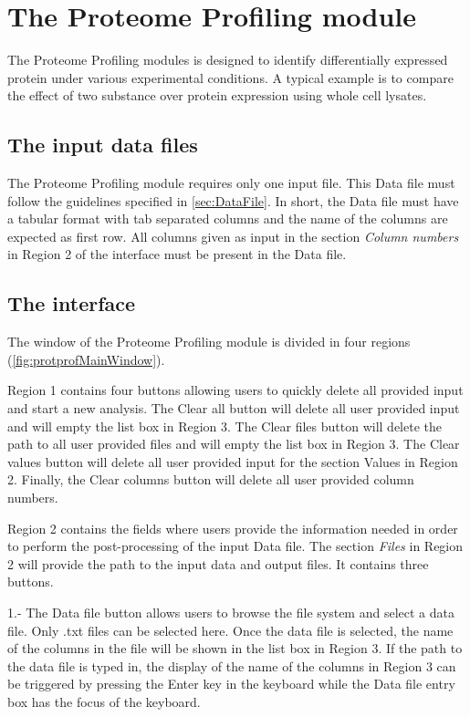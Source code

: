 \chapter{The Proteome Profiling module}
\label{chap:protprof}

The Proteome Profiling modules is designed to identify differentially expressed protein under various experimental conditions. A typical example is to compare the effect of two substance over protein expression using whole cell lysates.  

\section{The input data files}

The Proteome Profiling module requires only one input file. This Data file must follow the guidelines specified in \autoref{sec:DataFile}.  In short, the Data file must have a tabular format with tab separated columns and the name of the columns are expected as first row. All columns given as input in the section \textit{Column numbers} in Region \num{2} of the interface must be present in the Data file.

\section{The interface}

The window of the Proteome Profiling module is divided in four regions (\autoref{fig:protprofMainWindow}). 

Region \num{1} contains four buttons allowing users to quickly delete all provided input and start a new analysis. The Clear all button will delete all user provided input and will empty the list box in Region \num{3}. The Clear files button will delete the path to all user provided files and will empty the list box in Region \num{3}. The Clear values button will delete all user provided input for the section Values in Region \num{2}. Finally, the Clear columns button will delete all user provided column numbers. 

Region \num{2} contains the fields where users provide the information needed in order to perform the post-processing of the input Data file. The section \textit{Files} in Region \num{2} will provide the path to the input data and output files. It contains three buttons. 

\num{1}.- The Data file button allows users to browse the file system and select a data file. Only .txt files can be selected here. Once the data file is selected, the name of the columns in the file will be shown in the list box in Region \num{3}. If the path to the data file is typed in, the display of the name of the columns in Region \num{3} can be triggered by pressing the Enter key in the keyboard while the Data file entry box has the focus of the keyboard.

